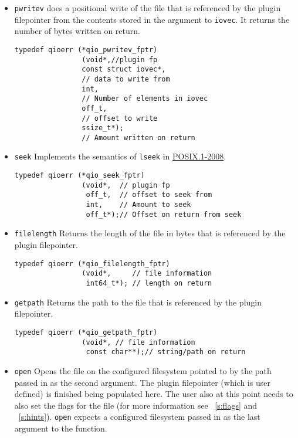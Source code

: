 \begin{itemize}
\begin{lstlisting}
\end{lstlisting}
\item {\tt pwritev} does a positional write of the file that is referenced by the plugin
filepointer from the contents stored in the argument to {\tt iovec}. It returns the
number of bytes written on return.
\begin{lstlisting}
typedef qioerr (*qio_pwritev_fptr) 
                (void*,//plugin fp
                const struct iovec*,      
                // data to write from
                int,                      
                // Number of elements in iovec 
                off_t,                    
                // offset to write 
                ssize_t*);                
                // Amount written on return
\end{lstlisting}
\item {\tt seek} Implements the semantics of {\tt lseek} in 
\href{http://pubs.opengroup.org/onlinepubs/9699919799/}{POSIX.1-2008}.
\begin{lstlisting}
typedef qioerr (*qio_seek_fptr)
                (void*,  // plugin fp
                 off_t,  // offset to seek from
                 int,    // Amount to seek
                 off_t*);// Offset on return from seek
\end{lstlisting}
\item {\tt filelength} Returns the length of the file in bytes that is referenced by the
plugin filepointer.
\begin{lstlisting}
typedef qioerr (*qio_filelength_fptr)
                (void*,     // file information 
                 int64_t*); // length on return
\end{lstlisting}
\item {\tt getpath} Returns the path to the file that is referenced by the plugin
filepointer.
\begin{lstlisting}
typedef qioerr (*qio_getpath_fptr)
                (void*, // file information
                 const char**);// string/path on return
\end{lstlisting}
\item {\tt open} Opens the file on the configured filesystem pointed to by the path passed in as
the second argument. The plugin filepointer (which is user defined) is finished being
populated here. The user also at this point needs to also set the flags for the file
(for more information see ~\ref{s:flags} and ~\ref{s:hints}). {\tt open} expects a configured filesystem
passed in as the last argument to the function.
\begin{lstlisting}

\end{lstlisting}
\end{itemize}
